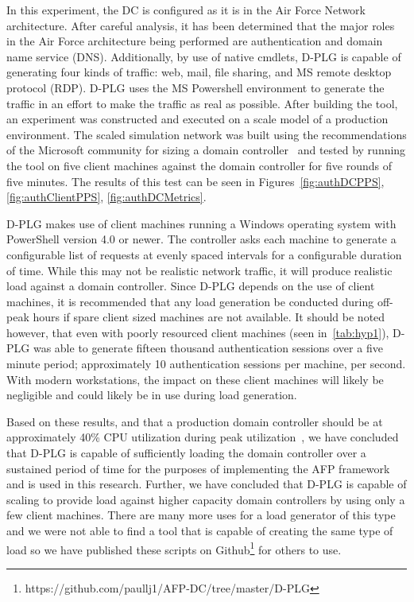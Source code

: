 In this experiment, the DC is configured as it is in the Air Force Network
architecture.  After careful analysis, it has been determined that the major
roles in the Air Force architecture being performed are authentication and
domain name service (DNS).  Additionally, by use of native cmdlets, D-PLG is
capable of generating four kinds of traffic: web, mail, file sharing, and MS
remote desktop protocol (RDP).  D-PLG uses the MS Powershell environment to
generate the traffic in an effort to make the traffic as real as possible.
After building the tool, an experiment was constructed and executed on a scale
model of a production environment.  The scaled simulation network was built
using the recommendations of the Microsoft community for sizing a domain
controller~\cite{mak12} and tested by running the tool on five client machines
against the domain controller for five rounds of five minutes.  The results of
this test can be seen in Figures~\ref{fig:authDCPPS}, \ref{fig:authClientPPS},
\ref{fig:authDCMetrics}.

\figAuthDCPPS
\figAuthClientPPS
\figAuthDCMetrics

D-PLG makes use of client machines running a Windows operating system with
PowerShell version 4.0 or newer.  The controller asks each machine to generate
a configurable list of requests at evenly spaced intervals for a configurable
duration of time.  While this may not be realistic network traffic, it will
produce realistic load against a domain controller.  Since D-PLG depends on the
use of client machines, it is recommended that any load generation be conducted
during off-peak hours if spare client sized machines are not available.  It
should be noted however, that even with poorly resourced client machines (seen
in~\ref{tab:hyp1}), D-PLG was able to generate fifteen thousand authentication
sessions over a five minute period; approximately 10 authentication sessions
per machine, per second.  With modern workstations, the impact on these client
machines will likely be negligible and could likely be in use during load
generation.

Based on these results, and that a production domain controller should be at
approximately 40\% CPU utilization during peak utilization~\cite{mak12}, we
have concluded that D-PLG is capable of sufficiently loading the domain
controller over a sustained period of time for the purposes of implementing the
AFP framework and is used in this research.  Further, we have concluded that
D-PLG is capable of scaling to provide load against higher capacity domain
controllers by using only a few client machines.  There are many more uses for
a load generator of this type and we were not able to find a tool that is
capable of creating the same type of load so we have published these scripts on
Github\footnote{https://github.com/paullj1/AFP-DC/tree/master/D-PLG} for others
to use.

